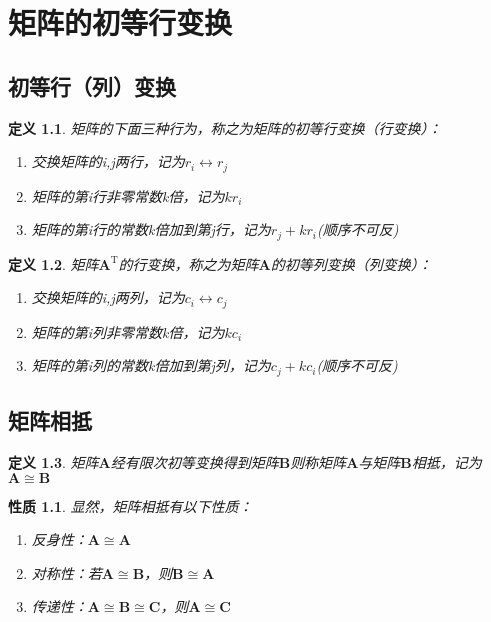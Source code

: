 \documentclass[a4paper]{ctexbook}
\newtheorem{definition}{定义}[section]
\newtheorem{property}[section]{性质}
\begin{document}
\chapter{矩阵的初等行变换}
\section{初等行（列）变换}
\begin{definition}
    \kaishu 矩阵的下面三种行为，称之为矩阵的初等行变换（行变换）：
\begin{enumerate}
    \item 交换矩阵的i,j两行，记为\(r_i \leftrightarrow r_j \)
    \item 矩阵的第i行非零常数k倍，记为\(kr_i\)
    \item 矩阵的第i行的常数k倍加到第j行，记为\(r_j+kr_i\)(顺序不可反)
\end{enumerate}
\end{definition}

\begin{definition}
    \kaishu 矩阵\(\mathbf{A}^\mathrm{T}\)的行变换，称之为矩阵\(\mathbf{A}\)的初等列变换（列变换）：
\begin{enumerate}
    \item 交换矩阵的i,j两列，记为\(c_i \leftrightarrow c_j \)
    \item 矩阵的第i列非零常数k倍，记为\(kc_i\)
    \item 矩阵的第i列的常数k倍加到第j列，记为\(c_j+kc_i\)(顺序不可反)
\end{enumerate}
\end{definition}
\section{矩阵相抵}
\begin{definition}
    矩阵\(\mathbf{A}\)经有限次初等变换得到矩阵\(\mathbf{B}\)则称矩阵\(\mathbf{A}\)与矩阵\(\mathbf{B}\)相抵，记为\(\mathbf{A}\cong \mathbf{B}\)
\end{definition}
\begin{property}
    显然，矩阵相抵有以下性质：
    \begin{enumerate}
        \item 反身性：\(\mathbf{A}\cong \mathbf{A}\)
        \item 对称性：若\(\mathbf{A}\cong \mathbf{B}\)，则\(\mathbf{B}\cong \mathbf{A}\)
        \item 传递性：\(\mathbf{A}\cong \mathbf{B}\cong \mathbf{C}\)，则\(\mathbf{A}\cong \mathbf{C}\)
    \end{enumerate}
\end{property}
\end{document}
